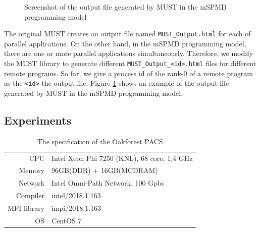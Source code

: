 \documentclass[graybox]{svmult}
\begin{document}
\begin{figure}[t]
\begin{center}
\caption{Screenshot of the output file generated by MUST in the mSPMD programming model}
\label{figure:myx-result-screenshot}
\end{center}
\end{figure}

The original MUST creates an output file named {\tt MUST\_Output.html} for each of parallel applications.
On the other hand, in the mSPMD programming model, there are one or more parallel applications simultaneously. Therefore, we modify the MUST library to generate different {\tt MUST\_Output\_<id>.html} files for different remote programs. So far, we give a process id of the rank-0 of a remote program as the {\tt <id>} the output file. Figure \ref{figure:myx-result-screenshot} shows an example of the output file generated by MUST in the mSPMD programming model. 

\subsection{Experiments}

\begin{table}[t]
\begin{center}
 \caption{The specification of the Oakforest PACS}
 \label{tb:ofp}
\begin{tabular}[t]{rl}\hline\hline
CPU & Intel Xeon Phi 7250 (KNL), 68 core, 1.4 GHz\\
Memory & 96GB(DDR) + 16GB(MCDRAM)\\
Network  & Intel Omni-Path Network, 100 Gpbs\\
Compiler & intel/2018.1.163\\
MPI library & impi/2018.1.163\\
OS & CentOS 7\\\hline
\end{tabular}
\end{center}
\end{table}
\end{document}
